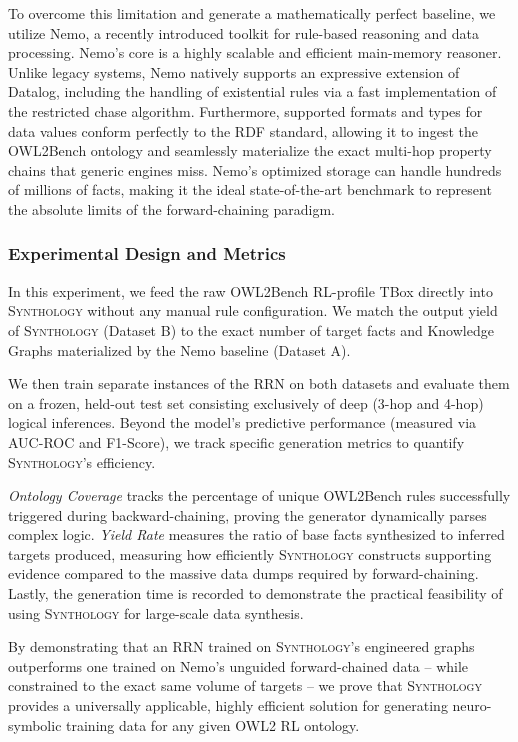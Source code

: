 \documentclass{IOS-Book-Article}     %
\begin{document}
To overcome this limitation and generate a mathematically perfect baseline, we utilize Nemo, a recently introduced toolkit for rule-based reasoning and data processing. Nemo's core is a highly scalable and efficient main-memory reasoner. Unlike legacy systems, Nemo natively supports an expressive extension of Datalog, including the handling of existential rules via a fast implementation of the restricted chase algorithm. Furthermore, supported formats and types for data values conform perfectly to the RDF standard, allowing it to ingest the OWL2Bench ontology and seamlessly materialize the exact multi-hop property chains that generic engines miss. Nemo's optimized storage can handle hundreds of millions of facts, making it the ideal state-of-the-art benchmark to represent the absolute limits of the forward-chaining paradigm.

\subsubsection{Experimental Design and Metrics}

In this experiment, we feed the raw OWL2Bench RL-profile TBox directly into \textsc{Synthology} without any manual rule configuration. We match the output yield of \textsc{Synthology} (Dataset B) to the exact number of target facts and Knowledge Graphs materialized by the Nemo baseline (Dataset A).

We then train separate instances of the RRN on both datasets and evaluate them on a frozen, held-out test set consisting exclusively of deep (3-hop and 4-hop) logical inferences. Beyond the model's predictive performance (measured via AUC-ROC and F1-Score), we track specific generation metrics to quantify \textsc{Synthology}'s efficiency.

\textit{Ontology Coverage} tracks the percentage of unique OWL2Bench rules successfully triggered during backward-chaining, proving the generator dynamically parses complex logic. \textit{Yield Rate} measures the ratio of base facts synthesized to inferred targets produced, measuring how efficiently \textsc{Synthology} constructs supporting evidence compared to the massive data dumps required by forward-chaining. Lastly, the generation time is recorded to demonstrate the practical feasibility of using \textsc{Synthology} for large-scale data synthesis.

By demonstrating that an RRN trained on \textsc{Synthology}'s engineered graphs outperforms one trained on Nemo's unguided forward-chained data -- while constrained to the exact same volume of targets -- we prove that \textsc{Synthology} provides a universally applicable, highly efficient solution for generating neuro-symbolic training data for any given OWL2 RL ontology.
\end{document}
